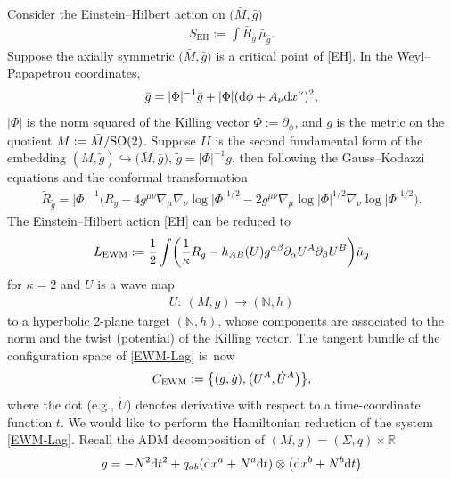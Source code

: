 \documentclass[pdftex]{sigma}
\def\ptl{\partial}%
\def\grad{{\nabla}}%
\def\halb{\frac{1}{2}}%
\def \a{\alpha}
\def \b {\beta}
\renewcommand{\a}{\alpha}
\renewcommand{\b}{\beta}
\numberwithin{equation}{section}
\begin{document}
Consider the Einstein--Hilbert action on $\bigl(\bar{M}, \bar{g}\bigr)$
\begin{align} \label{EH}
S_{\text{EH}} := \int \bar{R}_{\bar{g}} \, \bar{\mu}_{\bar{g}}.
\end{align}
Suppose the axially symmetric $\bigl(\bar{M}, \bar{g}\bigr)$ is a critical point of \eqref{EH}. In the Weyl--Papapetrou coordinates,
\begin{align*}
\bar{g} = \vert \Phi \vert^{-1} \bar{g} + \vert \Phi \vert ({\rm d}\phi + A_\nu {\rm d}x^\nu)^2,
\end{align*}
$ \vert \Phi \vert$ is the norm squared of the Killing vector $ \Phi := \ptl_\phi$, and $g$ is the metric on the quotient $M := \bar{M}/{\rm SO}(2)$. Suppose $II$ is the second fundamental form of the embedding $(M, \tilde{g}) \hookrightarrow \bigl(\bar{M}, \bar{g}\bigr)$, $\tilde{g} = \vert \Phi \vert^{-1} g$, then following the Gauss--Kodazzi equations and the conformal transformation
\begin{align*}
\tilde{R}_{\tilde{g}} = \vert \Phi \vert^{-1} \bigl(R_g -4 g^{\mu \nu} \grad_\mu \grad_\nu \log \vert \Phi \vert^{1/2} - 2 g^{\mu \nu} \grad_\mu \log \vert \Phi \vert^{1/2} \grad_\nu \log \vert \Phi \vert^{1/2}\bigr).
\end{align*}
The Einstein--Hilbert action \eqref{EH} can be reduced to
\begin{align}\label{EWM-Lag}
L_{{\rm EWM}} := \halb \int \biggl(\frac{1}{\kappa} R_g - h_{AB} (U) g^{\a \b} \ptl_\a U^A \ptl_\b U^B \biggr) \bar{\mu}_g
\end{align}
for $\kappa =2$ and $U$ is a wave map
\begin{align*}
U \colon\ (M, g) \to (\mathbb{N}, h)
\end{align*}
to a hyperbolic 2-plane target $(\mathbb{N}, h)$, whose components are associated to the norm and the twist (potential) of the Killing vector. The tangent bundle of the configuration space of \eqref{EWM-Lag} is~now
\begin{align*}
C_{{\rm EWM}} := \bigl\{ (g, \dot{g}), \bigl(U^A, \dot{U}^A\bigr) \bigr\},
\end{align*}
where the dot \big(e.g., $\dot{U}$\big) denotes derivative with respect to a time-coordinate function $t$.
We would like to perform the Hamiltonian reduction of the system \eqref{EWM-Lag}. Recall the ADM decomposition of $(M, g) = (\Sigma, q) \times \mathbb{R}$
\begin{align*}
g = -N^2 {\rm d}t^2 + q_{ab} ({\rm d}x^a + N^a {\rm d}t) \otimes \bigl({\rm d}x^b + N^b {\rm d}t\bigr)
\end{align*}
\end{document}
